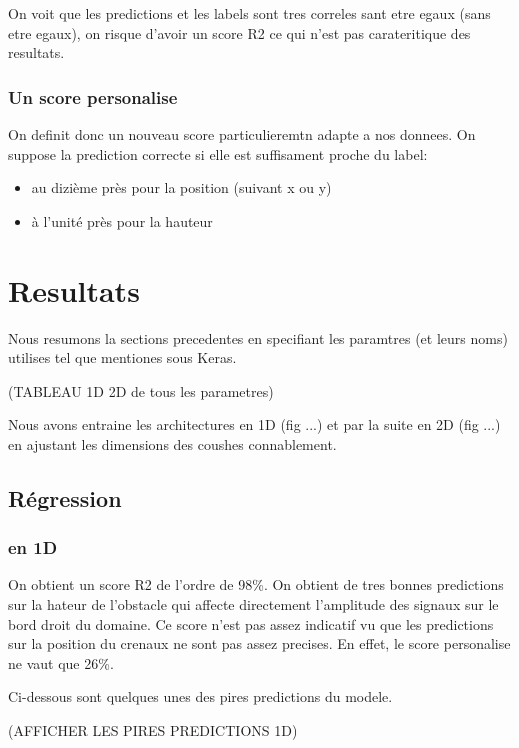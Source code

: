 On voit que les predictions et les labels sont tres correles sant etre egaux (sans etre egaux), on risque d'avoir un score R2 ce qui n'est pas carateritique des resultats.

\subsubsection{Un score personalise}
On definit donc un nouveau score particulieremtn adapte a nos donnees. On suppose la prediction correcte si elle est suffisament proche du label:
\begin{itemize}
 \item au dizième près pour la position (suivant x ou y)
 \item à l'unité près pour la hauteur
\end{itemize}


\section{Resultats}

Nous resumons la sections precedentes en specifiant les paramtres (et leurs noms) utilises tel que mentiones sous Keras.

(TABLEAU 1D 2D de tous les parametres)

Nous avons entraine les architectures en 1D (fig ...) et par la suite en 2D (fig ...) en ajustant les dimensions des coushes connablement.

\subsection{Régression}
% 
    \subsubsection{en 1D}
    On obtient un score R2 de l'ordre de 98\%. On obtient de tres bonnes predictions sur la hateur de l'obstacle qui affecte directement l'amplitude des signaux sur le bord droit du domaine. Ce score n'est pas assez indicatif vu que les predictions sur la position du crenaux ne sont pas assez precises. En effet, le score personalise ne vaut que 26\%.
    
    Ci-dessous sont quelques unes des pires predictions du modele.
    
    (AFFICHER LES PIRES PREDICTIONS 1D)

